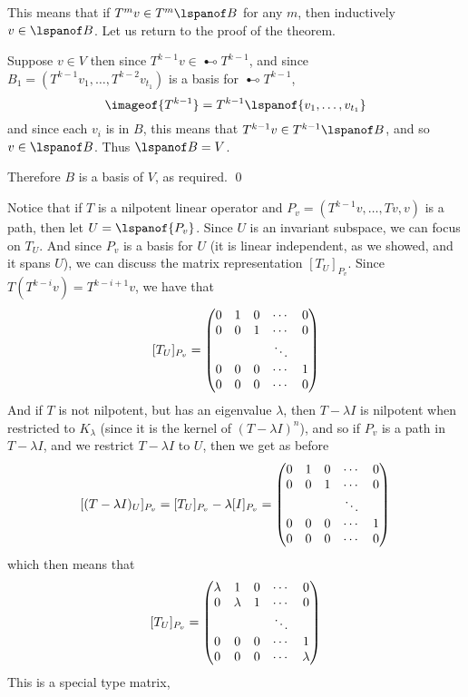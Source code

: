 This means that if $T^mv\in T^m\lspanof B$ for any $m$, then inductively $v\in\lspanof B$.
Let us return to the proof of the theorem.

\begin{blankpp}

    Suppose $v\in V$ then since $T^{k-1}v\in\imageof{T^{k-1}}$, and since $B_1=(T^{k-1}v_1,\dots,T^{k-2}v_{t_1})$ is a basis for $\imageof{T^{k-1}}$,
    \[ \imageof{T^{k-1}} = T^{k-1}\lspanof{v_1,\dots,v_{t_1}} \]
    and since each $v_i$ is in $B$, this means that $T^{k-1}v\in T^{k-1}\lspanof B$, and so $v\in\lspanof B$.
    Thus $\lspanof B=V$.

    Therefore $B$ is a basis of $V$, as required.
    \qed

\end{blankpp}

Notice that if $T$ is a nilpotent linear operator and $P_v=(T^{k-1}v,\dots,Tv,v)$ is a path, then let $U=\lspanof{P_v}$.
Since $U$ is an invariant subspace, we can focus on $T_U$.
And since $P_v$ is a basis for $U$ (it is linear independent, as we showed, and it spans $U$), we can discuss the matrix representation $[T_U]_{P_v}$.
Since $T(T^{k-i}v)=T^{k-i+1}v$, we have that
\[ [T_U]_{P_v} = \begin{pmatrix}0 & 1 & 0 & \cdots & 0 \\ 0 & 0 & 1 & \cdots & 0 \\ & & & \ddots & \\ 0 & 0 & 0 & \cdots & 1 \\ 0 & 0 & 0 & \cdots & 0\end{pmatrix} \]
And if $T$ is not nilpotent, but has an eigenvalue $\lambda$, then $T-\lambda I$ is nilpotent when restricted to $K_\lambda$ (since it is the kernel of $(T-\lambda I)^n$), and so if $P_v$ is a path in
$T-\lambda I$, and we restrict $T-\lambda I$ to $U$, then we get as before
\[ [(T-\lambda I)_U]_{P_v} = [T_U]_{P_v} - \lambda[I]_{P_v} = \begin{pmatrix}0 & 1 & 0 & \cdots & 0 \\ 0 & 0 & 1 & \cdots & 0 \\ & & & \ddots & \\ 0 & 0 & 0 & \cdots & 1 \\ 0 & 0 & 0 & \cdots & 0\end{pmatrix} \]
which then means that
\[ [T_U]_{P_v} = \begin{pmatrix}\lambda & 1 & 0 & \cdots & 0 \\ 0 & \lambda & 1 & \cdots & 0 \\ & & & \ddots & \\ 0 & 0 & 0 & \cdots & 1 \\ 0 & 0 & 0 & \cdots & \lambda\end{pmatrix} \]
This is a special type matrix,

